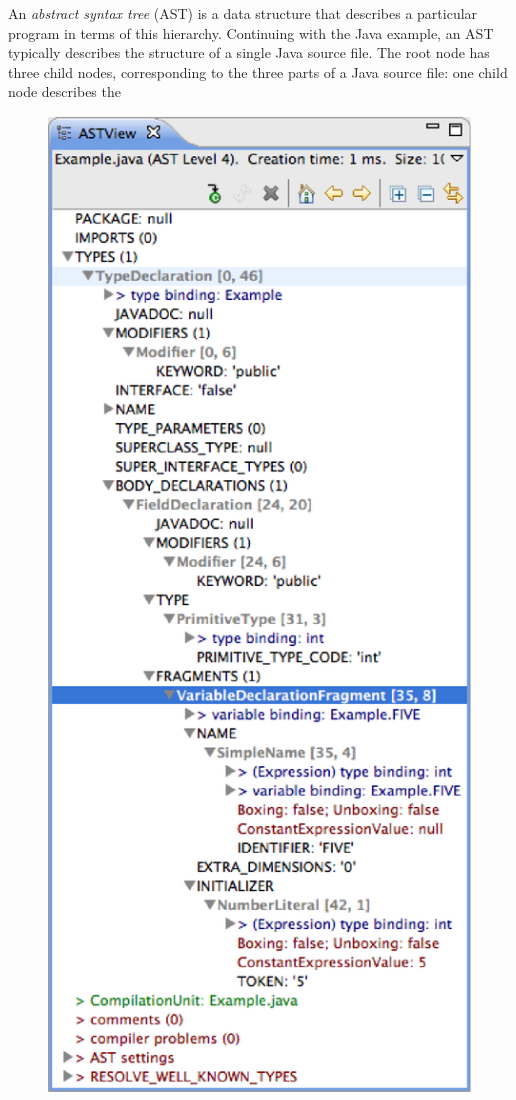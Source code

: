 \documentclass[prodmode]{acmlarge}
\begin{document}
An \textit{abstract syntax tree} (AST) is a data structure that describes a
particular program in terms of this hierarchy.  Continuing with the Java
example, an AST typically describes the structure of a single Java source file.
The root node has three child nodes, corresponding to the three parts of a Java
source file: one child node describes the 

\begin{figure} %
\includegraphics[scale=0.62]{jdt-ast.eps}

\end{figure}
\end{document}
